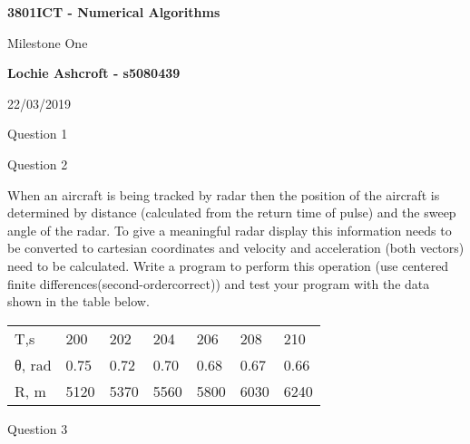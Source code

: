 \documentclass{article}
\begin{document}
		\begin{center}
			\vspace*{1cm}
			
			\Huge
			\textbf{3801ICT - Numerical Algorithms}
			
			\vspace{0.5cm}
			\LARGE
			Milestone One
			
			\vspace{1.5cm}
			
			\LARGE
			\textbf{Lochie Ashcroft - s5080439}
			
			\vfill
			\LARGE
			22/03/2019
			
		\end{center}
		\pagebreak
		
		Question 1
		
		\pagebreak
		
		\LARGE
		Question 2
		
		\normalsize
		When an aircraft is being tracked by radar then the position of the aircraft is determined by distance  (calculated  from  the  return  time  of  pulse)  and  the  sweep angle of the  radar.  To give  a  meaningful  radar  display  this  information  needs  to  be  converted  to  cartesian coordinates  and  velocity  and  acceleration  (both  vectors)  need  to  be  calculated.  Write  a program to perform this operation (use centered finite differences(second-ordercorrect)) and test your program with the data shown in the table below.
		
		\begin{table}[]
			\begin{tabular}{lllllll}
				T,s    & 200  & 202  & 204  & 206  & 208  & 210  \\
				θ, rad & 0.75 & 0.72 & 0.70 & 0.68 & 0.67 & 0.66 \\
				R, m   & 5120 & 5370 & 5560 & 5800 & 6030 & 6240
			\end{tabular}
		\end{table}
		
		\pagebreak
		
		Question 3
\end{document}

